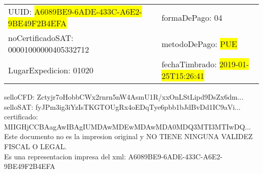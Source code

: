 \documentclass{article}
\begin{document}
\begin{tabular}{p{11cm}p{1cm}p{8cm}}
\bigskip
UUID: \colorbox{yellow}{ A6089BE9-6ADE-433C-A6E2-9BE49F2B4EFA } & & formaDePago: 04\\

noCertificadoSAT: 00001000000405332712 & & metodoDePago: \colorbox{yellow}{ PUE }\\

LugarExpedicion: 01020 & & fechaTimbrado: \colorbox{yellow}{ 2019-01-25T15:26:41 } \\
\end{tabular}

\bigskip
selloCFD: Zctyjr7oHobbCWx2rnrn5nW4AsmU1R/xxOnLStLipd9DsZx6dm... \\
selloSAT: fyJPm3ig3iYzIsTKGTOUgRx4oEDqTye6pbb1bJdBvDd1IC9aVi... \\

certificado: MIIGHjCCBAagAwIBAgIUMDAwMDEwMDAwMDA0MDQ3MTI3MTIwDQ...\bigskip\bigskip\bigskip\bigskip\bigskip\bigskip
\\Este documento no es la impresion original y NO TIENE NINGUNA VALIDEZ FISCAL O LEGAL. \\
 Es una representacion impresa del xml:  A6089BE9-6ADE-433C-A6E2-9BE49F2B4EFA \\
\end{document}
